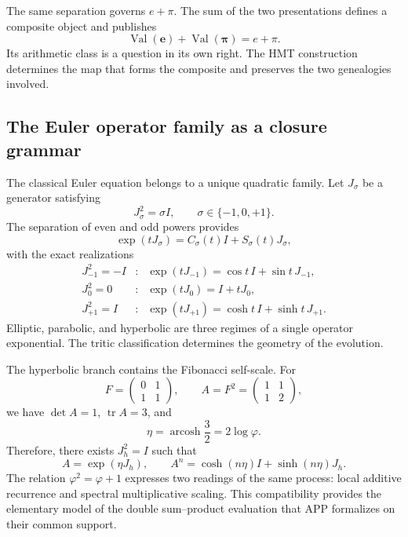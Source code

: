 The same separation governs \(e+\pi\). The sum of the two presentations
defines a composite object and publishes
\[
 \operatorname{Val}(\boldsymbol e)+
 \operatorname{Val}(\boldsymbol\pi)=e+\pi.
\]
Its arithmetic class is a question in its own right. The HMT construction
determines the map that forms the composite and preserves the two genealogies
involved.

\subsection{The Euler operator family as a closure grammar}

The classical Euler equation belongs to a unique quadratic family. Let
\(J_\sigma\) be a generator satisfying
\[
 J_\sigma^2=\sigma I,
 \qquad \sigma\in\{-1,0,+1\}.
\]
The separation of even and odd powers provides
\begin{equation}
 \exp(tJ_\sigma)=C_\sigma(t)I+S_\sigma(t)J_\sigma,
 \label{p3-83-c44-s2:eq:euler-trigeometrico-cierre-numero}
\end{equation}
with the exact realizations
\[
\begin{array}{ccl}
J_{-1}^2=-I&:&\exp(tJ_{-1})=\cos t\,I+\sin t\,J_{-1},\\[1mm]
J_{0}^2=0&:&\exp(tJ_{0})=I+tJ_{0},\\[1mm]
J_{+1}^2=I&:&\exp(tJ_{+1})=\cosh t\,I+\sinh t\,J_{+1}.
\end{array}
\]
Elliptic, parabolic, and hyperbolic are three regimes of a single
operator exponential. The tritic classification determines the geometry of
the evolution.

The hyperbolic branch contains the Fibonacci self-scale. For
\[
 F=\begin{pmatrix}0&1\\1&1\end{pmatrix},
 \qquad
 A=F^2=\begin{pmatrix}1&1\\1&2\end{pmatrix},
\]
we have \(\det A=1\), \(\operatorname{tr}A=3\), and
\[
 \eta=\operatorname{arcosh}\frac32=2\log\varphi.
\]
Therefore, there exists \(J_h^2=I\) such that
\begin{equation}
 A=\exp(\eta J_h),
 \qquad
 A^n=\cosh(n\eta)I+\sinh(n\eta)J_h.
 \label{p3-83-c44-s2:eq:fibonacci-euler-hiperbolico-cierre-numero}
\end{equation}
The relation \(\varphi^2=\varphi+1\) expresses two readings of the same process:
local additive recurrence and spectral multiplicative scaling. This
compatibility provides the elementary model of the double
sum--product evaluation that APP formalizes on their common support.

